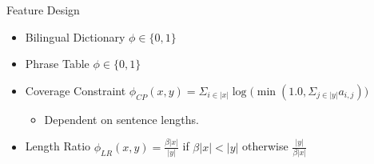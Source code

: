 \documentclass{beamer}
\begin{document}
\begin{frame}{Feature Design}{}
\begin{itemize}
\item Bilingual Dictionary $\phi \in \{0, 1\}$
\item Phrase Table $\phi \in \{0, 1\}$

\item Coverage Constraint $\phi_{CP}(x,y) = \Sigma_{i \in |x|} \log \big( \min (1.0, \Sigma_{j \in |y|} a_{i,j}) \big)$
\begin{itemize}
\item Dependent on sentence lengths.
\end{itemize}

\item Length Ratio $\phi_{LR}(x, y) = \frac{\beta|x|}{|y|}$ if $\beta|x| < |y|$ otherwise $\frac{|y|}{\beta|x|}$

\end{itemize}

\end{frame}
\end{document}
